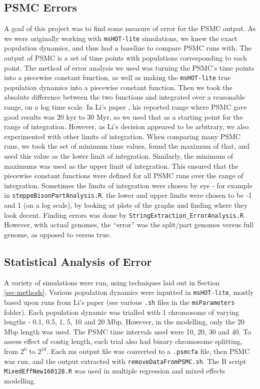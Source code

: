 \documentclass[11pt,a4paper]{article}
\begin{document}
\subsection{PSMC Errors}
A goal of this project was to find some measure of error for the PSMC output. As we were originally working with \verb|msHOT-lite| simulations, we knew the exact population dynamics, and thus had a baseline to compare PSMC runs with. The output of PSMC is a set of time points with populations corresponding to each point. The method of error analysis we used was turning the PSMC's time points into a piecewise constant function, as well as making the \verb|msHOT-lite| true population dynamics into a piecewise constant function. Then we took the absolute difference between the two functions and integrated over a reasonable range, on a log time scale. In Li's paper \cite{li2011inference}, his reported range where PSMC gave good results was 20 kyr to 30 Myr, so we used that as a starting point for the range of integration. However, as Li's decision appeared to be arbitrary, we also experimented with other limits of integration. When comparing many PSMC runs, we took the set of minimum time values, found the maximum of that, and used this value as the lower limit of integration. Similarly, the minimum of maximums was used as the upper limit of integration. This ensured that the piecewise constant functions were defined for all PSMC runs over the range of integration. Sometimes the limits of integration were chosen by eye - for example in \verb|steppeBisonPartAnalysis.R|, the lower and upper limits were chosen to be -1 and 1 (on a log scale), by looking at plots of the graphs and finding where they look decent. Finding errors was done by \verb|StringExtraction_ErrorAnalysis.R|. However, with actual genomes, the ``error'' was the split/part genomes versus full genome, as opposed to versus true.

\subsection{Statistical Analysis of Error}
A variety of simulations were run, using techniques laid out in Section \ref{sec:methods}. Various population dynamics were inputted in \verb|msHOT-lite|, mostly based upon runs from Li's paper \cite{li2011inference} (see various \verb|.sh| files in the \verb|msParameters| folder). Each population dynamic was trialled with 1 chromosome of varying lengths - 0.1, 0.5, 1, 5, 10 and 20 Mbp. However, in the modelling, only the 20 Mbp length was used. The PSMC time intervals used were 10, 20, 30 and 40. To assess effect of contig length, each trial also had binary chromosome splitting, from $2^0$ to $2^{10}$. Each ms output file was converted to a \verb|.psmcfa| file, then PSMC was run, and the output extracted with \verb|removeDataFromPSMC.sh|. The R script \verb|MixedEffNew160128.R| was used in multiple regression and mixed effects modelling.
\end{document}
